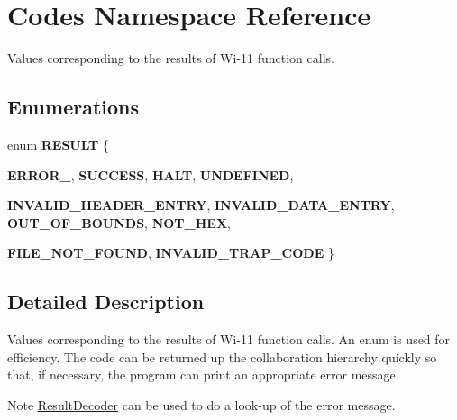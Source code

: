 \hypertarget{namespaceCodes}{
\section{Codes Namespace Reference}
\label{namespaceCodes}
}


Values corresponding to the results of Wi-\/11 function calls.  


\subsection*{Enumerations}
\begin{DoxyCompactItemize}
\item 
enum {\bfseries RESULT} \{ \par
{\bfseries ERROR\_}, 
{\bfseries SUCCESS}, 
{\bfseries HALT}, 
{\bfseries UNDEFINED}, 
\par
{\bfseries INVALID\_\-HEADER\_\-ENTRY}, 
{\bfseries INVALID\_\-DATA\_\-ENTRY}, 
{\bfseries OUT\_\-OF\_\-BOUNDS}, 
{\bfseries NOT\_\-HEX}, 
\par
{\bfseries FILE\_\-NOT\_\-FOUND}, 
{\bfseries INVALID\_\-TRAP\_\-CODE}
 \}
\end{DoxyCompactItemize}


\subsection{Detailed Description}
Values corresponding to the results of Wi-\/11 function calls. An enum is used for efficiency. The code can be returned up the collaboration hierarchy quickly so that, if necessary, the program can print an appropriate error message

\begin{DoxyNote}{Note}
\hyperlink{classResultDecoder}{ResultDecoder} can be used to do a look-\/up of the error message. 
\end{DoxyNote}
